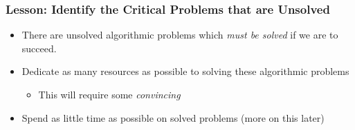 \documentclass{beamer}
\begin{document}
\frame
{
    \frametitle{Lesson: Identify the Critical Problems that are Unsolved}

    \begin{itemize}

        \item There are unsolved algorithmic problems which {\em must be
            solved} if we are to succeed.

        \item Dedicate as many resources as possible to solving these
            algorithmic problems

            \begin{itemize}
                \item This will require some {\em convincing}
            \end{itemize}

        \item Spend as little time as possible on solved problems (more on this later)

    \end{itemize}

}
\end{document}
